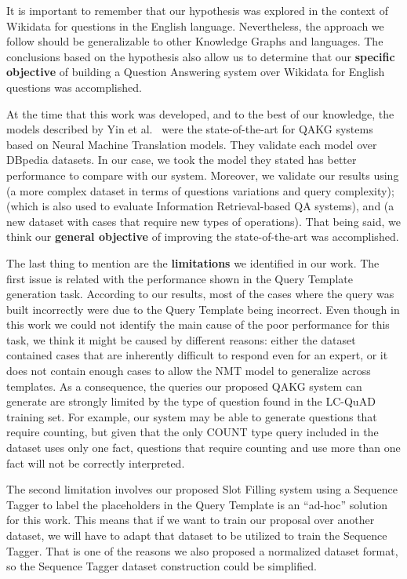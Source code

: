 It is important to remember that our hypothesis was explored in the context of Wikidata for questions 
in the English language. Nevertheless, the approach we follow should be generalizable to other 
Knowledge Graphs and languages. The conclusions based on the hypothesis also allow us to determine 
that our \textbf{specific objective} of building a Question Answering system over Wikidata for 
English questions was accomplished.

At the time that this work was developed, and to the best of our knowledge, the models described by 
Yin et al.~\cite{nmt:nl-to-sparql-Yin19} were the state-of-the-art for QAKG systems based on Neural 
Machine Translation models. They validate each model over DBpedia datasets. In our case, we took the 
model they stated has better performance to compare with our system. Moreover, we validate our 
results using \LCQuADtwo{} (a more complex dataset in terms of questions variations and \SPARQL{} query 
complexity); \QALDseven{} (which is also used to evaluate Information Retrieval-based QA systems), and 
\WikiSPARQL{} (a new dataset with cases that require new types of operations). That being said, we 
think our \textbf{general objective} of improving the state-of-the-art was accomplished.

The last thing to mention are the \textbf{limitations} we identified in our work. The first issue is 
related with the performance shown in the Query Template generation task. According to our results, 
most of the cases where the \SPARQL{} query was built incorrectly were due to the Query Template being 
incorrect. Even though in this work we could not identify the main cause of the poor performance for 
this task, we think it might be caused by different reasons: either the \LCQuADtwo{} dataset contained 
cases that are inherently difficult to respond even for an \SPARQL{} expert, or it does not contain 
enough cases to allow the NMT model to generalize across templates. As a consequence, the \SPARQL{} 
queries our proposed QAKG system can generate are strongly limited by the type of question found in 
the LC-QuAD training set. For example, our system may be able to generate questions that require 
counting, but given that the only COUNT type query included in the \LCQuADtwo{} dataset uses only one 
fact, questions that require counting and use more than one fact will not be correctly interpreted.

The second limitation involves our proposed Slot Filling system using a Sequence Tagger to label the 
placeholders in the Query Template is an “ad-hoc” solution for this work. This means that if we want 
to train our proposal over another dataset, we will have to adapt that dataset to be utilized to 
train the Sequence Tagger. That is one of the reasons we also proposed a normalized dataset format, 
so the Sequence Tagger dataset construction could be simplified.

